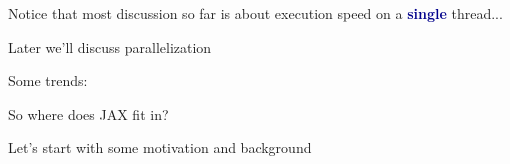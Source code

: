 \documentclass[
    xcolor={svgnames,dvipsnames},
    hyperref={colorlinks, citecolor=DeepPink4, linkcolor=DarkRed, urlcolor=DarkBlue}
    ]{beamer}  %
\newcommand{\navy}[1]{\textcolor{DarkBlue}{\bf #1}}
\newcommand{\1}{\mathbbm 1}
\begin{document}
\begin{frame}
    
    Notice that most discussion so far is about execution speed on a
    \navy{single} thread...


    \vspace{0.5em}
    \vspace{0.5em}
    \vspace{0.5em}


    Later we'll discuss parallelization

\end{frame}

\begin{frame}

    Some trends: 

    \begin{figure}
       \begin{center}
       \end{center}
    \end{figure}

\end{frame}



\begin{frame}
    
    So where does JAX fit in?

        \vspace{0.5em}
        \vspace{0.5em}
        \vspace{0.5em}
        \vspace{0.5em}
        \vspace{0.5em}
    Let's start with some motivation and background

\end{frame}
\end{document}
